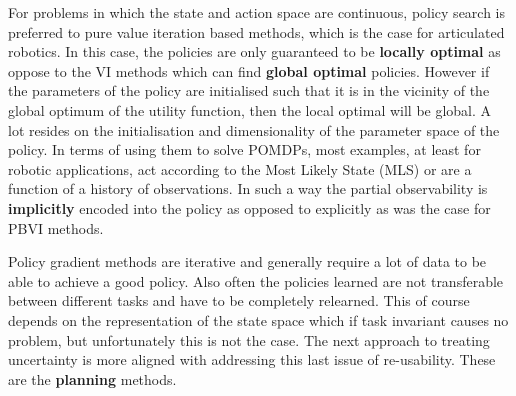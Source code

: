 For problems in which the state and action space are continuous, policy search is preferred to pure value iteration based methods, 
which is the case for articulated robotics. In this case, the policies are only guaranteed to be \textbf{locally optimal} as oppose 
to the VI methods which can find \textbf{global optimal} policies. However if the parameters of the policy are initialised 
such that it is in the vicinity of the global optimum of the utility function, then the local optimal will be global. 
A lot resides on the initialisation and dimensionality of the parameter space of the policy. 
In terms of using them to solve POMDPs, most examples, at least for robotic applications, act according to the Most Likely State (MLS) or 
are a function of a history of observations. In such a way the partial observability is \textbf{implicitly} encoded into the policy as 
opposed to explicitly as was the case for PBVI methods. 

Policy gradient methods are iterative and generally require a lot of data to be able to achieve a good policy. Also 
often the policies learned are not transferable between different tasks and have to be completely 
relearned. This of course depends on the representation of the state space which if task invariant causes no problem,
but unfortunately this is not the case. The next approach to treating uncertainty is more aligned with addressing this last issue 
of re-usability. These are the \textbf{planning} methods.



